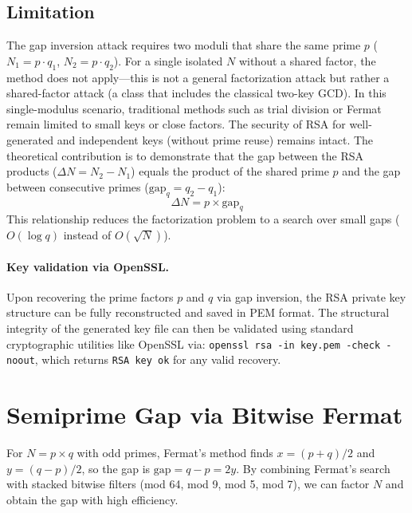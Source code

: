 \documentclass{sbc2023-pdf}%
\theoremstyle{plain}
\begin{document}
\subsection{Limitation}

The gap inversion attack requires two moduli that share the same prime \(p\) (\(N_1 = p \cdot q_1\), \(N_2 = p \cdot q_2\)). For a single isolated \(N\) without a shared factor, the method does not apply---this is not a general factorization attack but rather a shared-factor attack (a class that includes the classical two-key GCD). In this single-modulus scenario, traditional methods such as trial division or Fermat remain limited to small keys or close factors. The security of RSA for well-generated and independent keys (without prime reuse) remains intact. The theoretical contribution is to demonstrate that the gap between the RSA products (\(\Delta N = N_2 - N_1\)) equals the product of the shared prime \(p\) and the gap between consecutive primes (\(\text{gap}_q = q_2 - q_1\)):
\[
\Delta N = p \times \text{gap}_q
\]
This relationship reduces the factorization problem to a search over small gaps (\(O(\log q)\) instead of \(O(\sqrt{N})\)).

\paragraph{Key validation via OpenSSL.}
Upon recovering the prime factors \(p\) and \(q\) via gap inversion, the RSA private key structure can be fully reconstructed and saved in PEM format. The structural integrity of the generated key file can then be validated using standard cryptographic utilities like OpenSSL via: \texttt{openssl rsa -in key.pem -check -noout}, which returns \texttt{RSA key ok} for any valid recovery.

\section{Semiprime Gap via Bitwise Fermat}
\label{sec:semiprime_gap}

For \(N = p \times q\) with odd primes, Fermat's method finds \(x = (p+q)/2\) and \(y = (q-p)/2\), so the gap is \(\text{gap} = q-p = 2y\). By combining Fermat's search with stacked bitwise filters (mod 64, mod 9, mod 5, mod 7), we can factor \(N\) and obtain the gap with high efficiency.
\end{document}
